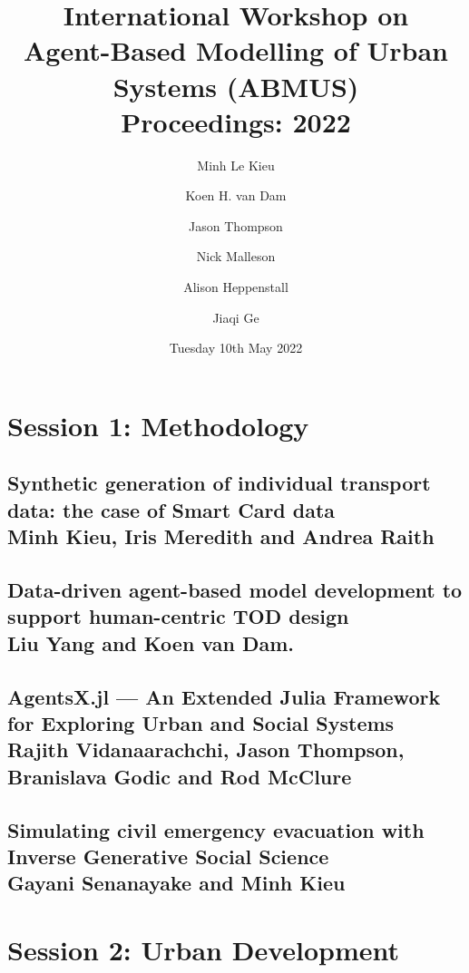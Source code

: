 \documentclass[a4paper,11pt]{article}
\begin{document}
\author{Minh Le Kieu \and Koen H. van Dam\and Jason Thompson \and Nick Malleson \and Alison Heppenstall \and Jiaqi Ge}
\title{International Workshop on \\ Agent-Based Modelling of Urban Systems (ABMUS) \\ Proceedings: 2022}
\date{Tuesday 10th May 2022}

\maketitle
\newpage
\tableofcontents

\newpage

\section{Session 1: Methodology}

\subsection{Synthetic generation of individual transport data: the case of Smart Card data
 \\ Minh Kieu, Iris Meredith and Andrea Raith}
 

\subsection{Data-driven agent-based model development to support human-centric TOD design \\ Liu Yang and Koen van Dam. }
 

\subsection{AgentsX.jl — An Extended Julia Framework for Exploring Urban and Social Systems \\ Rajith Vidanaarachchi, Jason Thompson, Branislava Godic and Rod McClure}
 

\subsection{Simulating civil emergency evacuation with Inverse Generative Social Science \\ Gayani Senanayake and Minh Kieu}
 


\section{Session 2: Urban Development}
\end{document}
